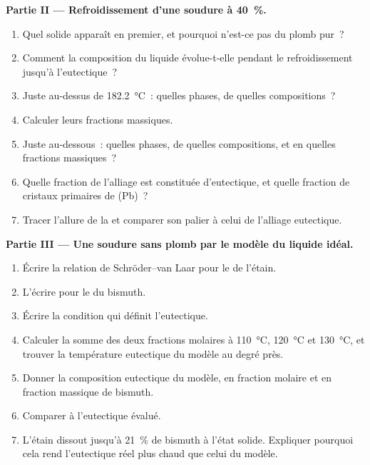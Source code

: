 \begin{problem}
\medskip
\noindent\textbf{Partie II --- Refroidissement d'une soudure à 40~\%.}
\begin{enumerate}[resume]
  \item Quel solide apparaît en premier, et pourquoi n'est-ce pas du plomb pur~?
  \item Comment la composition du liquide évolue-t-elle pendant le refroidissement jusqu'à
        l'eutectique~?
  \item Juste au-dessus de \qty{182.2}{\degreeCelsius}~: quelles phases, de quelles
        compositions~?
  \item Calculer leurs fractions massiques.
  \item Juste au-dessous~: quelles phases, de quelles compositions, et en quelles fractions
        massiques~?
  \item Quelle fraction de l'alliage est constituée d'eutectique, et quelle
        fraction de cristaux primaires de (Pb)~?
  \item Tracer l'allure de la  et comparer son palier à celui de
        l'alliage eutectique.
\end{enumerate}

\medskip
\noindent\textbf{Partie III --- Une soudure sans plomb par le modèle du liquide idéal.}
\begin{enumerate}[resume]
  \item Écrire la relation de Schröder--van Laar pour le  de l'étain.
  \item L'écrire pour le  du bismuth.
  \item Écrire la condition qui définit l'eutectique.
  \item Calculer la somme des deux fractions molaires à \qty{110}{\degreeCelsius},
        \qty{120}{\degreeCelsius} et \qty{130}{\degreeCelsius}, et trouver la
        température eutectique du modèle au degré près.
  \item Donner la composition eutectique du modèle, en fraction molaire et en fraction
        massique de bismuth.
  \item Comparer à l'eutectique évalué.
  \item L'étain dissout jusqu'à 21~\% de bismuth à l'état solide. Expliquer pourquoi cela
        rend l'eutectique réel plus chaud que celui du modèle.
\end{enumerate}


\end{problem}
